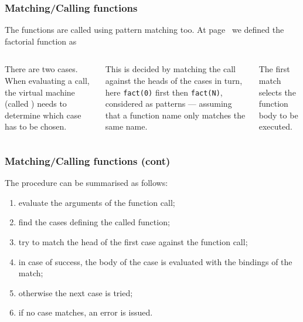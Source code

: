 %
\begin{frame}
\frametitle{Matching/Calling functions}

The \Erlang functions are called using pattern matching too. At
page~\pageref{fact} we defined the factorial function as
\begin{columns}
    There are two cases. When
  evaluating a call, the \Erlang virtual machine (called \BEAM) needs
  to determine which case has to be chosen.

   This is decided by matching the call against
  the heads of the cases in turn, here \texttt{fact(0)} first then
  \texttt{fact(N)}, considered as patterns --- assuming that a
  function name only matches the same name.

  \medskip

  The first match selects the function body to be executed.
\end{columns}

\end{frame}

%
\begin{frame}
\frametitle{Matching/Calling functions (cont)}

The procedure can be summarised as follows:
\begin{enumerate}

  \item evaluate the arguments of the function call;

  \item find the cases defining the called function;

  \item try to match the head of the first case against the function
    call;

  \item in case of success, the body of the case is evaluated with the
    bindings of the match;

  \item otherwise the next case is tried;

  \item if no case matches, an error is issued.

\end{enumerate}

\end{frame}

